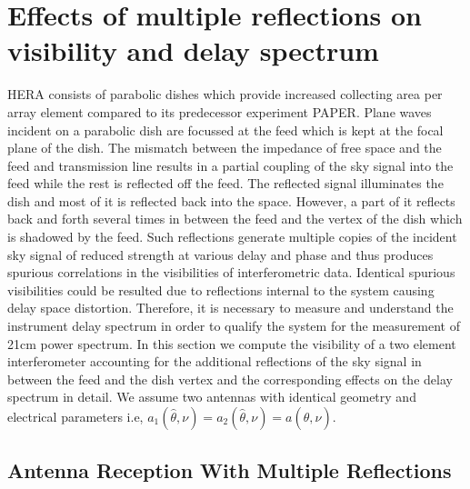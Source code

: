 \documentclass[twocolumn]{emulateapj}
\newcommand{\bmvolt}{{a}}
\newcommand{\thhat}{{\hat\theta}}
\begin{document}
    
    
    \section{\textbf{Effects of multiple reflections on visibility and delay spectrum}}
    
    HERA consists of parabolic dishes which
    provide increased collecting area per array element compared to its predecessor
    experiment PAPER. Plane waves incident on a parabolic dish are focussed at the
    feed which is kept at the focal plane of the dish.  The mismatch between the
    impedance of free space and the feed and transmission line results in a partial
    coupling of the sky signal into the feed while the rest is reflected off the
    feed.  The reflected signal illuminates the dish and most of it is reflected
    back into the space.  However, a part of it reflects back and forth several
    times in between the feed and the vertex of the dish which is shadowed by the
    feed.  Such reflections generate multiple copies of the incident sky signal of
    reduced strength at various delay and phase and thus produces spurious
    correlations in the visibilities of interferometric data.  Identical spurious
    visibilities could be resulted due to reflections internal to the system
    causing delay space distortion. Therefore, it is necessary to measure and
    understand the instrument delay spectrum in order to qualify the system for the
    measurement of 21cm power spectrum.  In this section we compute the visibility
    of a two element interferometer accounting for the additional reflections of
    the sky signal in between the feed and the dish vertex and the corresponding
    effects on the delay spectrum in detail. We assume two antennas with identical
    geometry and electrical parameters i.e,
    $\bmvolt_{1}(\thhat,\nu)=\bmvolt_{2}(\thhat,\nu) = \bmvolt(\thhat,\nu)$. 
    
     \subsection{Antenna Reception With Multiple Reflections}
    \label{sec:multiple}
    
\end{document}
